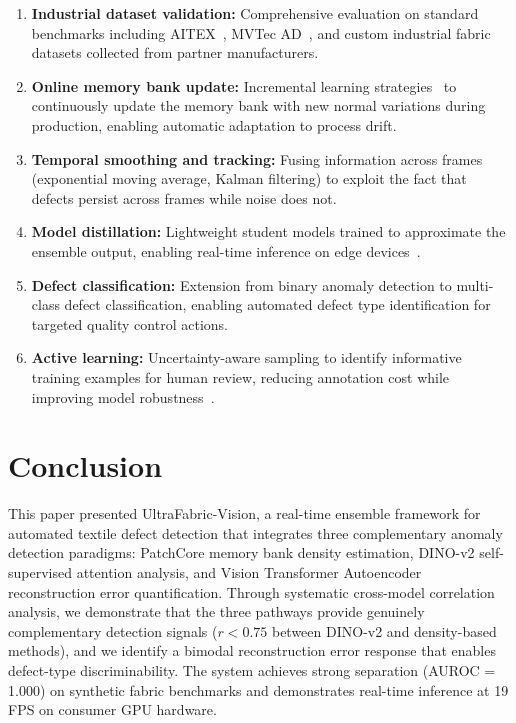 \documentclass[journal]{IEEEtran}
\begin{document}
\begin{enumerate}[nosep]
    \item \textbf{Industrial dataset validation:} Comprehensive evaluation on standard benchmarks including AITEX~\cite{silva2020aitex}, MVTec AD~\cite{bergmann2019mvtec}, and custom industrial fabric datasets collected from partner manufacturers.
    \item \textbf{Online memory bank update:} Incremental learning strategies~\cite{gunter2021sampling} to continuously update the memory bank with new normal variations during production, enabling automatic adaptation to process drift.
    \item \textbf{Temporal smoothing and tracking:} Fusing information across frames (exponential moving average, Kalman filtering) to exploit the fact that defects persist across frames while noise does not.
    \item \textbf{Model distillation:} Lightweight student models trained to approximate the ensemble output, enabling real-time inference on edge devices~\cite{liu2022efficient}.
    \item \textbf{Defect classification:} Extension from binary anomaly detection to multi-class defect classification, enabling automated defect type identification for targeted quality control actions.
    \item \textbf{Active learning:} Uncertainty-aware sampling to identify informative training examples for human review, reducing annotation cost while improving model robustness~\cite{park2023chexpert}.
\end{enumerate}

\section{Conclusion}
\label{sec:conclusion}

This paper presented UltraFabric-Vision, a real-time ensemble framework for automated textile defect detection that integrates three complementary anomaly detection paradigms: PatchCore memory bank density estimation, DINO-v2 self-supervised attention analysis, and Vision Transformer Autoencoder reconstruction error quantification. Through systematic cross-model correlation analysis, we demonstrate that the three pathways provide genuinely complementary detection signals ($r < 0.75$ between DINO-v2 and density-based methods), and we identify a bimodal reconstruction error response that enables defect-type discriminability. The system achieves strong separation (AUROC = 1.000) on synthetic fabric benchmarks and demonstrates real-time inference at 19 FPS on consumer GPU hardware.
\end{document}
